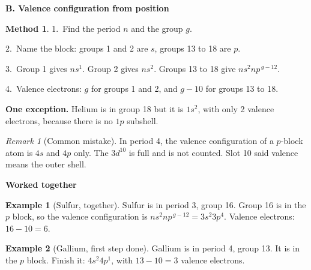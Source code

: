 \documentclass[11pt]{article}
\newcommand{\sect}[1]{\par\medskip\noindent\textbf{\large #1}\par\smallskip}
\theoremstyle{definition}\newtheorem*{example}{Example}\newtheorem*{method*}{Method}
\theoremstyle{remark}\newtheorem*{remark}{Remark}
\begin{document}
\begin{center}
{}
\end{center}


\sect{B. Valence configuration from position}
\begin{method*}
1.\ Find the period $n$ and the group $g$.\par
2.\ Name the block: groups 1 and 2 are $s$, groups 13 to 18 are $p$.\par
3.\ Group 1 gives $ns^{1}$. Group 2 gives $ns^{2}$. Groups 13 to 18 give $ns^{2}np^{\,g-12}$.\par
4.\ Valence electrons: $g$ for groups 1 and 2, and $g-10$ for groups 13 to 18.
\end{method*}
\textbf{One exception.} Helium is in group 18 but it is $1s^{2}$, with only 2 valence electrons, because there is no $1p$ subshell.
\begin{remark}[Common mistake]In period 4, the valence configuration of a $p$-block atom is $4s$ and $4p$ only. The $3d^{10}$ is full and is not counted. Slot 10 said valence means the outer shell.\end{remark}

\sect{Worked together}
\begin{example}[Sulfur, together]Sulfur is in period 3, group 16. Group 16 is in the $p$ block, so the valence configuration is $ns^{2}np^{\,g-12}=3s^{2}3p^{4}$. Valence electrons: $16-10=6$.\end{example}
\begin{example}[Gallium, first step done]Gallium is in period 4, group 13. It is in the $p$ block. Finish it: $4s^{2}4p^{1}$, with $13-10=3$ valence electrons.\end{example}
\end{document}
